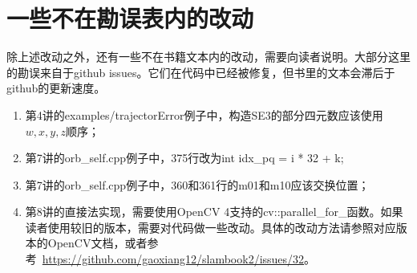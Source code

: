 \documentclass[lang=cn,11pt,numbers]{errata}
\begin{document}
\section{一些不在勘误表内的改动}
除上述改动之外，还有一些不在书籍文本内的改动，需要向读者说明。大部分这里的勘误来自于github issues。它们在代码中已经被修复，但书里的文本会滞后于github的更新速度。

\begin{enumerate}
	\item 第4讲的examples/trajectorError例子中，构造SE3的部分四元数应该使用$w,x,y,z$顺序；
	\item 第7讲的orb\_self.cpp例子中，375行改为int idx\_pq = i * 32 + k;
    \item 第7讲的orb\_self.cpp例子中，360和361行的m01和m10应该交换位置；
	\item 第8讲的直接法实现，需要使用OpenCV 4支持的cv::parallel\_for\_函数。如果读者使用较旧的版本，需要对代码做一些改动。具体的改动方法请参照对应版本的OpenCV文档，或者参考~\url{https://github.com/gaoxiang12/slambook2/issues/32}。

\end{enumerate}
\end{document}

